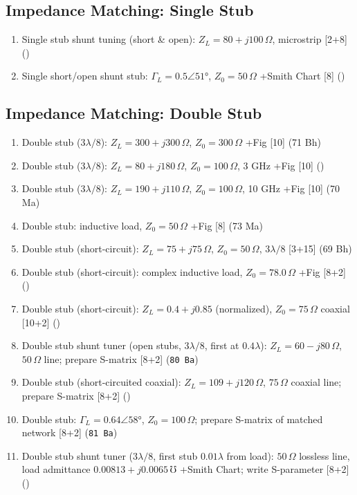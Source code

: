 \documentclass[12pt]{article}
\begin{document}
  \subsection{Impedance Matching: Single Stub}
    \begin{enumerate}[topsep=0pt, noitemsep]
      \item Single stub shunt tuning (short \& open): $Z_L = 80{+}j100\,\Omega$, microstrip \hfill [2+8] ()
      \item Single short/open shunt stub: $\Gamma_L = 0.5\angle51°$, $Z_0 = 50\,\Omega$ +Smith Chart \hfill [8] ()
    \end{enumerate}

  \subsection{Impedance Matching: Double Stub}
    \begin{enumerate}[topsep=0pt, noitemsep]
      \item Double stub ($3\lambda/8$): $Z_L = 300{+}j300\,\Omega$, $Z_0 = 300\,\Omega$ +Fig \hfill [10] (71 Bh)
      \item Double stub ($3\lambda/8$): $Z_L = 80{+}j180\,\Omega$, $Z_0 = 100\,\Omega$, 3 GHz +Fig \hfill [10] ()
      \item Double stub ($3\lambda/8$): $Z_L = 190{+}j110\,\Omega$, $Z_0 = 100\,\Omega$, 10 GHz +Fig \hfill [10] (70 Ma)
      \item Double stub: inductive load, $Z_0 = 50\,\Omega$ +Fig \hfill [8] (73 Ma)
      \item Double stub (short-circuit): $Z_L = 75{+}j75\,\Omega$, $Z_0 = 50\,\Omega$, $3\lambda/8$ \hfill [3+15] (69 Bh)
      \item Double stub (short-circuit): complex inductive load, $Z_0 = 78.0\,\Omega$ +Fig \hfill [8+2] ()
      \item Double stub (short-circuit): $Z_L = 0.4{+}j0.85$ (normalized), $Z_0 = 75\,\Omega$ coaxial \hfill [10+2] ()
      \item Double stub shunt tuner (open stubs, $3\lambda/8$, first at $0.4\lambda$): $Z_L = 60{-}j80\,\Omega$, $50\,\Omega$ line; prepare S-matrix \hfill [8+2] (\texttt{80 Ba})
      \item Double stub (short-circuited coaxial): $Z_L = 109{+}j120\,\Omega$, $75\,\Omega$ coaxial line; prepare S-matrix \hfill [8+2] ()
      \item Double stub: $\Gamma_L = 0.64\angle58°$, $Z_0 = 100\,\Omega$; prepare S-matrix of matched network \hfill [8+2] (\texttt{81 Ba})
      \item Double stub shunt tuner ($3\lambda/8$, first stub $0.01\lambda$ from load): $50\,\Omega$ lossless line, load admittance $0.00813{+}j0.0065\,\mho$ +Smith Chart; write S-parameter \hfill [8+2] ()
    \end{enumerate}
\end{document}
